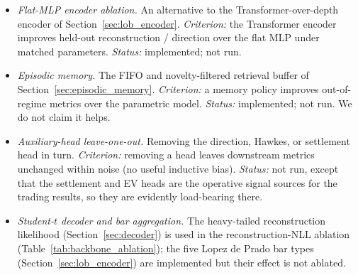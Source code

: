 \documentclass{article}
\begin{document}
\begin{itemize}[nosep]
  \item \emph{Flat-MLP encoder ablation.} An alternative to the
    Transformer-over-depth encoder of Section~\ref{sec:lob_encoder}.
    \emph{Criterion:} the Transformer encoder improves held-out
    reconstruction / direction over the flat MLP under matched parameters.
    \emph{Status:} implemented; not run.
  \item \emph{Episodic memory.} The FIFO and novelty-filtered retrieval
    buffer of Section~\ref{sec:episodic_memory}.  \emph{Criterion:} a memory
    policy improves out-of-regime metrics over the parametric model.
    \emph{Status:} implemented; not run.  We do not claim it helps.
  \item \emph{Auxiliary-head leave-one-out.} Removing the direction, Hawkes,
    or settlement head in turn.  \emph{Criterion:} removing a head leaves
    downstream metrics unchanged within noise (no useful inductive bias).
    \emph{Status:} not run, except that the settlement and EV heads are the
    operative signal sources for the trading results, so they are evidently
    load-bearing there.
  \item \emph{Student-$t$ decoder and bar aggregation.} The heavy-tailed
    reconstruction likelihood (Section~\ref{sec:decoder}) is used in the
    reconstruction-NLL ablation (Table~\ref{tab:backbone_ablation}); the five
    Lopez de Prado bar types (Section~\ref{sec:lob_encoder}) are implemented
    but their effect is not ablated.
\end{itemize}


\end{document}
